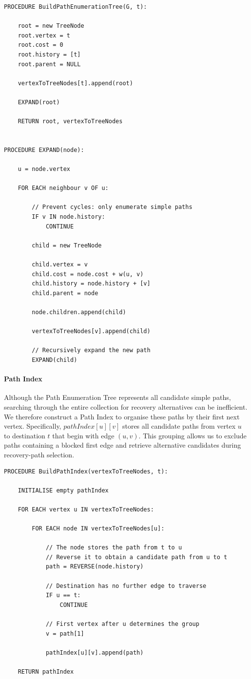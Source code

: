 \documentclass{article}
\begin{document}
\begin{lstlisting}[caption={Simple Path Tree Construction}]
PROCEDURE BuildPathEnumerationTree(G, t):

    root = new TreeNode
    root.vertex = t
    root.cost = 0
    root.history = [t]
    root.parent = NULL

    vertexToTreeNodes[t].append(root)

    EXPAND(root)

    RETURN root, vertexToTreeNodes


PROCEDURE EXPAND(node):

    u = node.vertex

    FOR EACH neighbour v OF u:

        // Prevent cycles: only enumerate simple paths
        IF v IN node.history:
            CONTINUE

        child = new TreeNode

        child.vertex = v
        child.cost = node.cost + w(u, v)
        child.history = node.history + [v]
        child.parent = node

        node.children.append(child)

        vertexToTreeNodes[v].append(child)

        // Recursively expand the new path
        EXPAND(child)
\end{lstlisting}

\paragraph{Path Index}

Although the Path Enumeration Tree represents all candidate simple paths, searching through the entire collection for recovery alternatives can be inefficient. We therefore construct a Path Index to organise these paths by their first next vertex. Specifically, $pathIndex[u][v]$ stores all candidate paths from vertex $u$ to destination $t$ that begin with edge $(u,v)$. This grouping allows us to exclude paths containing a blocked first edge and retrieve alternative candidates during recovery-path selection.

\begin{lstlisting}[caption={Path Index Construction}]
PROCEDURE BuildPathIndex(vertexToTreeNodes, t):

    INITIALISE empty pathIndex

    FOR EACH vertex u IN vertexToTreeNodes:

        FOR EACH node IN vertexToTreeNodes[u]:

            // The node stores the path from t to u
            // Reverse it to obtain a candidate path from u to t
            path = REVERSE(node.history)

            // Destination has no further edge to traverse
            IF u == t:
                CONTINUE

            // First vertex after u determines the group
            v = path[1]

            pathIndex[u][v].append(path)

    RETURN pathIndex
\end{lstlisting}
\end{document}
